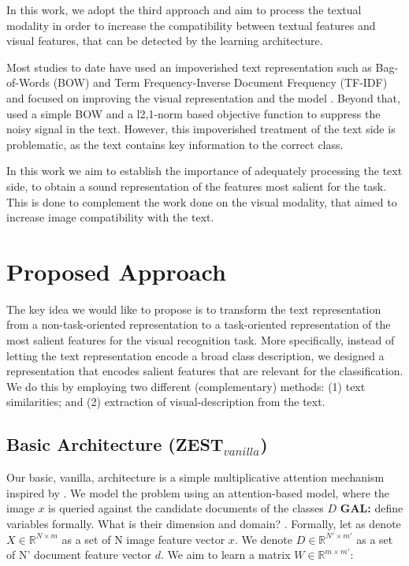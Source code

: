\documentclass[11pt,a4paper]{article}
\newcommand\gal[1]{\textcolor{bright}{\textbf{GAL:} #1 }}
\begin{document}
In this work, we adopt the third approach and aim to process the textual modality in order to increase the compatibility between textual features and visual features, that can be detected by the learning architecture.
\par

Most studies to date have used an impoverished text representation such as Bag-of-Words (BOW) and Term Frequency-Inverse Document Frequency (TF-IDF) and focused on improving the visual representation and the model \cite{lei2015predicting,elhoseiny2013write,elhoseiny2016write,elhoseiny2017link,zhu2018generative}. Beyond that, \citet{qiao2016less} used a simple BOW and a l2,1-norm based objective function to suppress the noisy signal in the text. However, this impoverished treatment of the text side is problematic, as the text contains key information to the correct class. 

In this work we aim to establish the importance of adequately processing the text side, to obtain a sound representation of the features most salient for the task. This is done to complement the work done on the visual modality, that aimed to increase image compatibility with the text.





\section{Proposed Approach}
\label{task}

The key idea we would like to propose is to transform the text representation from a non-task-oriented representation to a task-oriented representation of the most salient features for the visual recognition task. More specifically, instead of letting the text representation encode a broad class description, we designed a representation that encodes salient features that are relevant for the classification. We do this by employing two different (complementary) methods: (1) text similarities; and (2) extraction of visual-description from the text.


\subsection{Basic Architecture (ZEST$_{vanilla}$)}
\label{section_ZEST_C}


Our basic, vanilla, architecture is a simple multiplicative attention mechanism \cite{luong2015effective} inspired by \citet{romera2015embarrassingly}. We model the problem using an attention-based model, where the image $x$ is queried
against the candidate documents of the classes $D$ \gal{define variables formally. 
What is their dimension and domain?}.
Formally, let as denote $X\in \mathbb{R}^{N\times m}$ as a set of N image feature vector $x$.
We denote $D\in \mathbb{R}^{N'\times m'}$ as a set of N' document feature vector $d$.
We aim to learn a matrix \(W\in  \mathbb{R}^{m\times m'}\):
 
\end{document}
